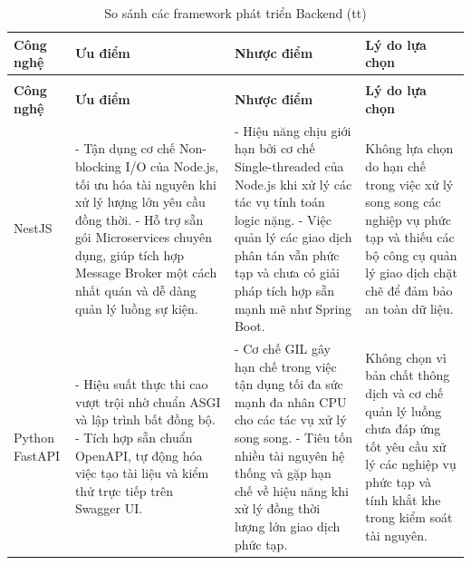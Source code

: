 \begin{center}
\begin{longtable}{|p{2.5cm}|p{4cm}|p{4cm}|p{3.5cm}|}
\caption{So sánh các framework phát triển Backend} \label{tab:backend_frameworks} \\
\hline
\centering\textbf{Công nghệ} & \centering\textbf{Ưu điểm} & \centering\textbf{Nhược điểm} & \centering\arraybackslash\textbf{Lý do lựa chọn} \\ \hline
\endfirsthead

\caption[]{So sánh các framework phát triển Backend (tt)} \\
\hline
\centering\textbf{Công nghệ} & \centering\textbf{Ưu điểm} & \centering\textbf{Nhược điểm} & \centering\arraybackslash\textbf{Lý do lựa chọn} \\ \hline
\endhead


NestJS & 
- Tận dụng cơ chế Non-blocking I/O của Node.js, tối ưu hóa tài nguyên khi xử lý lượng lớn yêu cầu đồng thời. \newline
- Hỗ trợ sẵn gói Microservices chuyên dụng, giúp tích hợp Message Broker một cách nhất quán và dễ dàng quản lý luồng sự kiện. & 
- Hiệu năng chịu giới hạn bởi cơ chế Single-threaded của Node.js khi xử lý các tác vụ tính toán logic nặng. \newline 
- Việc quản lý các giao dịch phân tán vẫn phức tạp và chưa có giải pháp tích hợp sẵn mạnh mẽ như Spring Boot. & 
Không lựa chọn do hạn chế trong việc xử lý song song các nghiệp vụ phức tạp và thiếu các bộ công cụ quản lý giao dịch chặt chẽ để đảm bảo an toàn dữ liệu. \\ \hline

Python FastAPI & 
- Hiệu suất thực thi cao vượt trội nhờ chuẩn ASGI và lập trình bất đồng bộ. \newline 
- Tích hợp sẵn chuẩn OpenAPI, tự động hóa việc tạo tài liệu và kiểm thử trực tiếp trên Swagger UI. &
- Cơ chế GIL gây hạn chế trong việc tận dụng tối đa sức mạnh đa nhân CPU cho các tác vụ xử lý song song. \newline 
- Tiêu tốn nhiều tài nguyên hệ thống và gặp hạn chế về hiệu năng khi xử lý đồng thời lượng lớn giao dịch phức tạp. & 
Không chọn vì bản chất thông dịch và cơ chế quản lý luồng chưa đáp ứng tốt yêu cầu xử lý các nghiệp vụ phức tạp và tính khắt khe trong kiểm soát tài nguyên. \\ \hline


\end{longtable}
\end{center}
